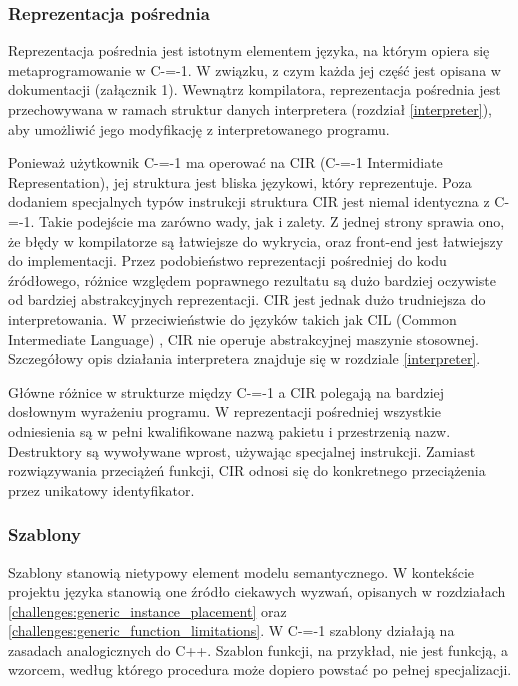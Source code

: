 \subsubsection{Reprezentacja pośrednia}
\label{implementation:intermidiate_representation}
Reprezentacja pośrednia jest istotnym elementem języka, na którym opiera się metaprogramowanie w C-=-1.
W związku, z czym każda jej część jest opisana w dokumentacji (załącznik 1).
Wewnątrz kompilatora, reprezentacja pośrednia jest przechowywana w ramach struktur danych interpretera (rozdział \ref{interpreter}), aby umożliwić jego modyfikację z interpretowanego programu.

Ponieważ użytkownik C-=-1 ma operować na CIR (C-=-1 Intermidiate Representation), jej struktura jest bliska językowi, który reprezentuje. 
Poza dodaniem specjalnych typów instrukcji struktura CIR jest niemal identyczna z C-=-1.
Takie podejście ma zarówno wady, jak i zalety. 
Z jednej strony sprawia ono, że błędy w kompilatorze są łatwiejsze do wykrycia, oraz front-end jest łatwiejszy do implementacji.
Przez podobieństwo reprezentacji pośredniej do kodu źródłowego, różnice względem poprawnego rezultatu są dużo bardziej oczywiste od bardziej abstrakcyjnych reprezentacji.
CIR jest jednak dużo trudniejsza do interpretowania.
W przeciwieństwie do języków takich jak CIL (Common Intermediate Language) \cite{ecma:cli}, CIR nie operuje abstrakcyjnej maszynie stosownej.
Szczegółowy opis działania interpretera znajduje się w rozdziale \ref{interpreter}.

Główne różnice w strukturze między C-=-1 a CIR polegają na bardziej dosłownym wyrażeniu programu. W reprezentacji pośredniej wszystkie odniesienia są w pełni kwalifikowane nazwą pakietu i przestrzenią nazw. Destruktory są wywoływane wprost, używając specjalnej instrukcji. Zamiast rozwiązywania przeciążeń funkcji, CIR odnosi się do konkretnego przeciążenia przez unikatowy identyfikator.

\subsubsection{Szablony}
\label{implementation:generics}
Szablony stanowią nietypowy element modelu semantycznego.
W kontekście projektu języka stanowią one źródło ciekawych wyzwań, opisanych w rozdziałach \ref{challenges:generic_instance_placement} oraz \ref{challenges:generic_function_limitations}.
W C-=-1 szablony działają na zasadach analogicznych do C++.
Szablon funkcji, na przykład, nie jest funkcją, a wzorcem, według którego procedura może dopiero powstać po pełnej specjalizacji.




